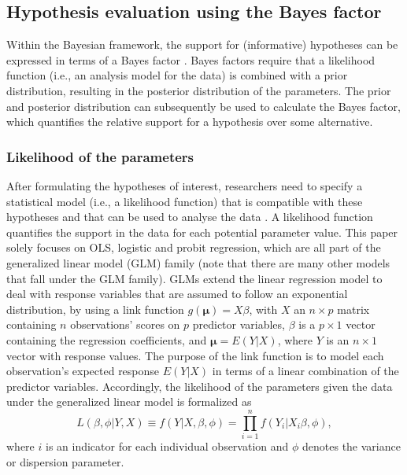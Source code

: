 \documentclass[review, 3p, authoryear]{elsarticle} %
\begin{document}
\hypertarget{hypothesis-evaluation-using-the-bayes-factor}{%
\subsection{Hypothesis evaluation using the Bayes factor}\label{hypothesis-evaluation-using-the-bayes-factor}}

Within the Bayesian framework, the support for (informative) hypotheses can be expressed in terms of a Bayes factor \citep{kass_raftery_bayes_factors_1995}.
Bayes factors require that a likelihood function (i.e., an analysis model for the data) is combined with a prior distribution, resulting in the posterior distribution of the parameters.
The prior and posterior distribution can subsequently be used to calculate the Bayes factor, which quantifies the relative support for a hypothesis over some alternative.

\hypertarget{likelihood-of-the-parameters}{%
\subsubsection{Likelihood of the parameters}\label{likelihood-of-the-parameters}}

After formulating the hypotheses of interest, researchers need to specify a statistical model (i.e., a likelihood function) that is compatible with these hypotheses and that can be used to analyse the data \citep{lynch_introduction_2007}.
A likelihood function quantifies the support in the data for each potential parameter value.
This paper solely focuses on OLS, logistic and probit regression, which are all part of the generalized linear model (GLM) family (note that there are many other models that fall under the GLM family).
GLMs extend the linear regression model to deal with response variables that are assumed to follow an exponential distribution, by using a link function \(g(\boldsymbol{\mu}) = X\beta\), with \(X\) an \(n \times p\) matrix containing \(n\) observations' scores on \(p\) predictor variables, \(\beta\) is a \(p \times 1\) vector containing the regression coefficients, and \(\boldsymbol{\mu} = E(Y|X)\), where \(Y\) is an \(n \times 1\) vector with response values.
The purpose of the link function is to model each observation's expected response \(E(Y|X)\) in terms of a linear combination of the predictor variables.
Accordingly, the likelihood of the parameters given the data under the generalized linear model is formalized as
\[
L(\beta, \phi|Y, X) \equiv f(Y|X, \beta, \phi) = \prod^n_{i=1} f(Y_i|X_i \beta, \phi),
\]
where \(i\) is an indicator for each individual observation and \(\phi\) denotes the variance or dispersion parameter.
\end{document}
